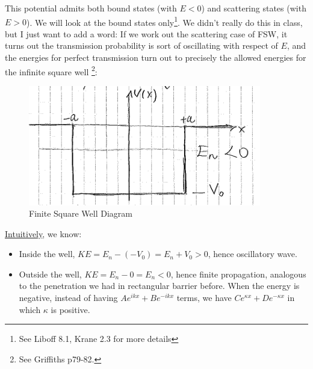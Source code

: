 \documentclass{school-22.101-notes}
\date{September 28, 2011}
\begin{document}
\maketitle

This potential admits both bound states (with $E < 0$) and scattering states (with $E>0$). We will look at the bound states only\footnote{See Liboff 8.1, Krane 2.3 for more details}. We didn't really do this in class, but I just want to add a word: If we work out the scattering case of FSW, it turns out the transmission probability is sort of oscillating with respect of $E$, and the energies for perfect transmission turn out to precisely the allowed energies for the infinite square well \footnote{See Griffiths p79-82.}:

\begin{figure}[h!]
    \centering
    \includegraphics[width=4in]{images/qm/FSW.png}
    \caption{Finite Square Well Diagram}
\end{figure}


\uline{Intuitively}, we know:
\begin{itemize}
\item Inside the well, $KE = E_n - (-V_0) = E_n + V_0 > 0$, hence oscillatory wave. 
\item Outside the well, $KE = E_n - 0 = E_n <0$, hence finite propagation, analogous to the penetration we had in rectangular barrier before. When the energy is negative, instead of having $A e^{ikx} + B e^{-ikx}$ terms, we have $C e^{\kappa x} + D e^{-\kappa x}$ in which $\kappa$ is positive. 
\end{itemize}
\end{document}
